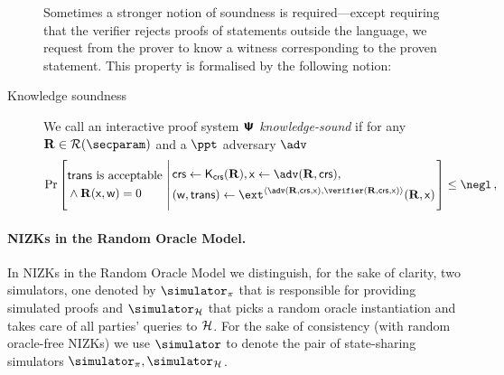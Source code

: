 \let\accentvec\vec \documentclass[runningheads,10pt]{llncs}
\begin{document}
\begin{description}
	Sometimes a stronger notion of soundness is required---except requiring that the verifier rejects proofs of statements outside the language, we request from the prover to know a witness corresponding to the proven statement. This property is formalised by the following notion:
	
	\item[Knowledge soundness] We call an interactive proof system $\bm{\mathsf{\Psi}}$
			\emph{knowledge-sound} if for any $\REL \in \RELGEN(\secparam)$ and a $\ppt$ adversary $\adv$
	\[
	\Pr\left[
		\begin{aligned}
			& \text{$\trans$ is acceptable} \\
			& \land \REL(\inp, \wit) = 0
	 \end{aligned}
	  \,\left|\,
	 \begin{aligned}
		 & \crs \gets \kcrs(\REL), \inp \gets \adv(\REL, \crs), \\
		 & (\wit, \trans) \gets \ext^{\ip{\adv(\REL, \crs, \inp)}{\verifier(\REL, \crs, \inp)}}(\REL, \inp)
	 \end{aligned}
	 \vphantom{\begin{aligned}
		 \adv (\trans) = 1, \\
		 \text{if $\trans{}$ is accepting} \\
		 \pcind \text{then $\REL(\inp, \wit)$}
	 \end{aligned}}\right.
	 \right] \leq \negl\,,
 \]
\end{description}

\paragraph{NIZKs in the Random Oracle Model.}
In NIZKs in the Random Oracle Model we distinguish, for the sake of clarity, two simulators, one denoted by $\simulator_\zkproof$ that is responsible for providing simulated proofs and $\simulator_\ro$ that picks a random oracle instantiation and takes care of all parties' queries to $\mathcal{H}$.
For the sake of consistency (with random oracle-free NIZKs) we use $\simulator$
to denote the pair of state-sharing simulators $\simulator_\zkproof,
\simulator_\ro$.
\end{document}
